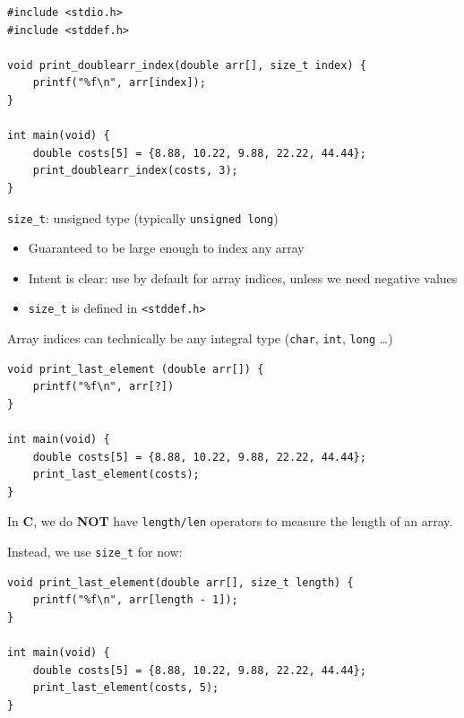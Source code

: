 \documentclass[11pt,a4paper]{article}
\providecommand{\tightlist}{\setlength{\itemsep}{0pt}\setlength{\parskip}{0pt}}
\begin{document}
\label{315-arrays-as-arguments-to-functions}
\hypertarget{315-arrays-as-arguments-to-functions}{}

\begin{lstlisting}[style=cscode]
#include <stdio.h>
#include <stddef.h>

void print_doublearr_index(double arr[], size_t index) {
    printf("%f\n", arr[index]);
}

int main(void) {
    double costs[5] = {8.88, 10.22, 9.88, 22.22, 44.44};
    print_doublearr_index(costs, 3);
}
\end{lstlisting}

\texttt{size\_t}: unsigned type (typically \texttt{unsigned\ long})

\begin{itemize}
\tightlist
\item
  Guaranteed to be large enough to index any array
\item
  Intent is clear: use by default for array indices, unless we need negative values
\item
  \texttt{size\_t} is defined in \texttt{\textless{}stddef.h\textgreater{}}
\end{itemize}

Array indices can technically be any integral type (\texttt{char}, \texttt{int}, \texttt{long} \ldots)

\label{316-length-of-arrays}
\hypertarget{316-length-of-arrays}{}

\begin{lstlisting}[style=cscode]
void print_last_element (double arr[]) {
    printf("%f\n", arr[?])
}

int main(void) {
    double costs[5] = {8.88, 10.22, 9.88, 22.22, 44.44};
    print_last_element(costs);
}
\end{lstlisting}

In \textbf{C}, we do \textbf{NOT} have \texttt{length/len} operators to measure the length of an array.

Instead, we use \texttt{size\_t} for now:

\begin{lstlisting}[style=cscode]
void print_last_element(double arr[], size_t length) {
    printf("%f\n", arr[length - 1]);
}

int main(void) {
    double costs[5] = {8.88, 10.22, 9.88, 22.22, 44.44};
    print_last_element(costs, 5);
}
\end{lstlisting}
\end{document}
